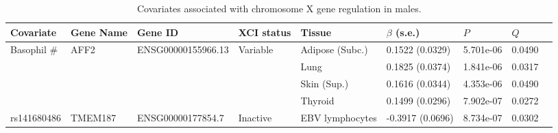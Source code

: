 \begin{table}[ht]
\scriptsize
\caption{Covariates associated with chromosome X gene regulation in males.}
\centering
\begin{tabular}{lllllllll}
  \hline
 Covariate & Gene Name & Gene ID & XCI status & Tissue & $\beta$ (s.e.) & $P$ & $Q$ \\ %
  \hline
  Basophil \# & AFF2 & ENSG00000155966.13 & Variable & Adipose (Subc.) & 0.1522 (0.0329) & 5.701e-06 & 0.0490 \\ %
  &  &  &  & Lung & 0.1825 (0.0374) & 1.841e-06 & 0.0317 \\ %
  &  & &  & Skin (Sup.) & 0.1616 (0.0344) & 4.353e-06 & 0.0490 \\ %
   &  &  &  & Thyroid & 0.1499 (0.0296) & 7.902e-07 & 0.0272 \\ %
  rs141680486 & TMEM187 & ENSG00000177854.7 & Inactive &  EBV lymphocytes & -0.3917 (0.0696) & 8.734e-07 & 0.0302 \\ %
   \hline
\end{tabular}
\label{table:table4.4}
\end{table}